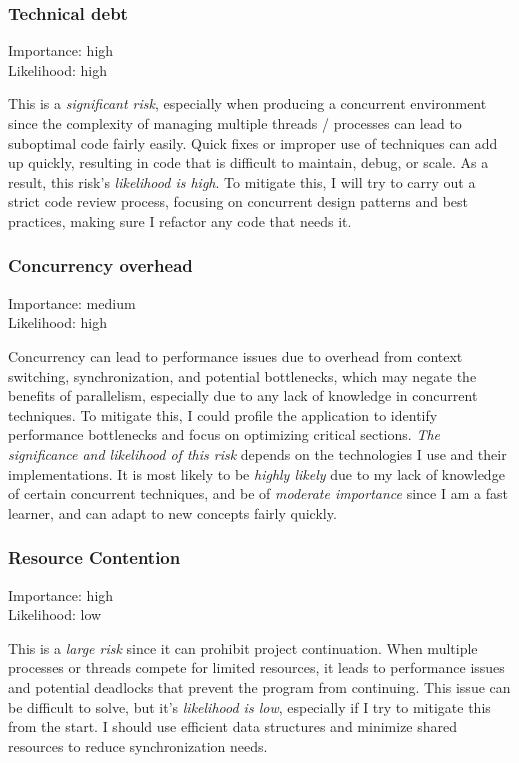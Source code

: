 \documentclass[]{project_plan}
\begin{document}
\subsubsection{Technical debt}
Importance: high\\
Likelihood: high

This is a \textit{significant risk}, especially when producing a concurrent environment since
the complexity of managing multiple threads / processes can lead to suboptimal
code fairly easily. Quick fixes or improper use of techniques can add up quickly,
resulting in code that is difficult to maintain, debug, or scale. As a result, this risk's
\textit{likelihood is high}. To mitigate this, I will try to carry out a strict code review process,
focusing on concurrent design patterns and best practices, making sure I refactor any code that needs it.

\subsubsection{Concurrency overhead}
Importance: medium\\
Likelihood: high

Concurrency can lead to performance issues due to overhead from
context switching, synchronization, and potential bottlenecks, which may
negate the benefits of parallelism, especially due to any lack of knowledge in
concurrent techniques. To mitigate this, I could profile the application to identify
performance bottlenecks and focus on optimizing critical sections. \textit{The significance and likelihood
  of this risk} depends on the technologies I use and their implementations.
It is most likely to be \textit{highly likely} due to my lack of knowledge of certain
concurrent techniques, and be of \textit{moderate importance} since I am a fast learner,
and can adapt to new concepts fairly quickly.

\subsubsection{Resource Contention}
Importance: high\\
Likelihood: low

This is a \textit{large risk} since it can prohibit project continuation. When multiple processes
or threads compete for limited resources, it leads to performance issues and potential
deadlocks that prevent the program from continuing. This issue can be difficult to solve,
but it's \textit{likelihood is low}, especially if I try to mitigate this from the start. I should use
efficient data structures and minimize shared resources to reduce synchronization needs.
\end{document}
